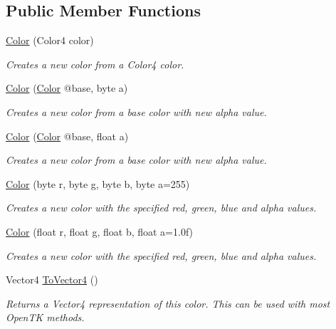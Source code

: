 \subsection*{Public Member Functions}
\begin{DoxyCompactItemize}
\item 
\hyperlink{struct_tri_devs_1_1_tri_engine_1_1_color_acefa751f70e0b95d2fd88e60ec14044c}{Color} (Color4 color)
\begin{DoxyCompactList}\small\item\em Creates a new color from a Color4 color. \end{DoxyCompactList}\item 
\hyperlink{struct_tri_devs_1_1_tri_engine_1_1_color_a5a76c751c6cdfcd7949e95e7e0ec653c}{Color} (\hyperlink{struct_tri_devs_1_1_tri_engine_1_1_color}{Color} @base, byte a)
\begin{DoxyCompactList}\small\item\em Creates a new color from a base color with new alpha value. \end{DoxyCompactList}\item 
\hyperlink{struct_tri_devs_1_1_tri_engine_1_1_color_a907eb25220f0884298ef9b065f9f9fc8}{Color} (\hyperlink{struct_tri_devs_1_1_tri_engine_1_1_color}{Color} @base, float a)
\begin{DoxyCompactList}\small\item\em Creates a new color from a base color with new alpha value. \end{DoxyCompactList}\item 
\hyperlink{struct_tri_devs_1_1_tri_engine_1_1_color_aab7327b1a9c659fefa2fc28dfe4a792a}{Color} (byte r, byte g, byte b, byte a=255)
\begin{DoxyCompactList}\small\item\em Creates a new color with the specified red, green, blue and alpha values. \end{DoxyCompactList}\item 
\hyperlink{struct_tri_devs_1_1_tri_engine_1_1_color_a657eddbaa983e9660bc81cc10da69239}{Color} (float r, float g, float b, float a=1.\-0f)
\begin{DoxyCompactList}\small\item\em Creates a new color with the specified red, green, blue and alpha values. \end{DoxyCompactList}\item 
Vector4 \hyperlink{struct_tri_devs_1_1_tri_engine_1_1_color_a64fe157316cbbb9722d30eecf2541e36}{To\-Vector4} ()
\begin{DoxyCompactList}\small\item\em Returns a Vector4 representation of this color. This can be used with most Open\-T\-K methods. \end{DoxyCompactList}\item 

\end{DoxyCompactItemize}
